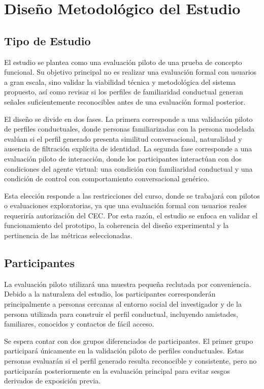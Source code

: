 \documentclass[12pt]{article}
\begin{document}
\section{Diseño Metodológico del Estudio}

\subsection{Tipo de Estudio}

El estudio se plantea como una evaluación piloto de una prueba de concepto funcional. Su objetivo principal no es realizar una evaluación formal con usuarios a gran escala, sino validar la viabilidad técnica y metodológica del sistema propuesto, así como revisar si los perfiles de familiaridad conductual generan señales suficientemente reconocibles antes de una evaluación formal posterior.

El diseño se divide en dos fases. La primera corresponde a una validación piloto de perfiles conductuales, donde personas familiarizadas con la persona modelada evalúan si el perfil generado presenta similitud conversacional, naturalidad y ausencia de filtración explícita de identidad. La segunda fase corresponde a una evaluación piloto de interacción, donde los participantes interactúan con dos condiciones del agente virtual: una condición con familiaridad conductual y una condición de control con comportamiento conversacional genérico.

Esta elección responde a las restricciones del curso, donde se trabajará con pilotos o evaluaciones exploratorias, ya que una evaluación formal con usuarios reales requeriría autorización del CEC. Por esta razón, el estudio se enfoca en validar el funcionamiento del prototipo, la coherencia del diseño experimental y la pertinencia de las métricas seleccionadas.

\subsection{Participantes}

La evaluación piloto utilizará una muestra pequeña reclutada por conveniencia. Debido a la naturaleza del estudio, los participantes corresponderán principalmente a personas cercanas al entorno social del investigador y de la persona utilizada para construir el perfil conductual, incluyendo amistades, familiares, conocidos y contactos de fácil acceso.

Se espera contar con dos grupos diferenciados de participantes. El primer grupo participará únicamente en la validación piloto de perfiles conductuales. Estas personas evaluarán si el perfil generado resulta reconocible y consistente, pero no participarán posteriormente en la evaluación principal para evitar sesgos derivados de exposición previa.
\end{document}
